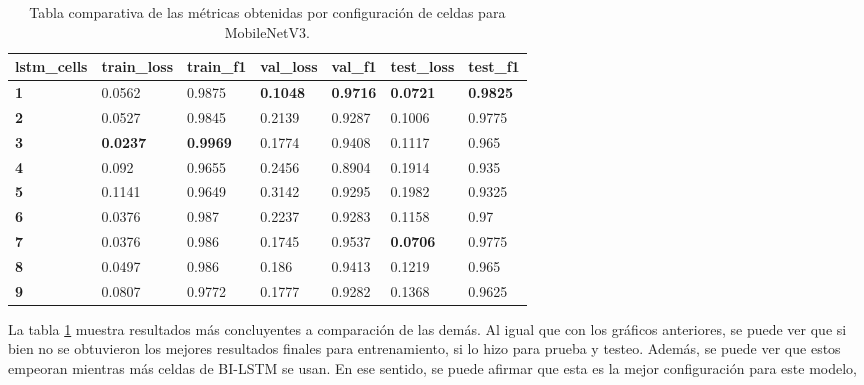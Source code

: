 \begin{table}[h!]
\centering
\begin{tabular}{|l|l|l|l|l|l|l|}
\hline
\textbf{lstm\_cells} & \textbf{train\_loss} & \textbf{train\_f1} & \textbf{val\_loss} & \textbf{val\_f1} & \textbf{test\_loss} & \textbf{test\_f1} \\ \hline
\textbf{1}           & 0.0562               & 0.9875             & \textbf{0.1048}    & \textbf{0.9716}  & \textbf{0.0721}     & \textbf{0.9825}   \\ \hline
\textbf{2}           & 0.0527               & 0.9845             & 0.2139             & 0.9287           & 0.1006              & 0.9775            \\ \hline
\textbf{3}           & \textbf{0.0237}      & \textbf{0.9969}    & 0.1774             & 0.9408           & 0.1117              & 0.965             \\ \hline
\textbf{4}           & 0.092                & 0.9655             & 0.2456             & 0.8904           & 0.1914              & 0.935             \\ \hline
\textbf{5}           & 0.1141               & 0.9649             & 0.3142             & 0.9295           & 0.1982              & 0.9325            \\ \hline
\textbf{6}           & 0.0376               & 0.987              & 0.2237             & 0.9283           & 0.1158              & 0.97              \\ \hline
\textbf{7}           & 0.0376               & 0.986              & 0.1745             & 0.9537           & \textbf{0.0706}     & 0.9775            \\ \hline
\textbf{8}           & 0.0497               & 0.986              & 0.186              & 0.9413           & 0.1219              & 0.965             \\ \hline
\textbf{9}           & 0.0807               & 0.9772             & 0.1777             & 0.9282           & 0.1368              & 0.9625            \\ \hline
\end{tabular}
\caption{ Tabla comparativa de las métricas obtenidas por configuración de celdas para MobileNetV3.}
\label{table:MobileNetV3Metrics}
\end{table}

La tabla \ref{table:MobileNetV3Metrics} muestra resultados más 
concluyentes a comparación de las demás. Al igual que con los gráficos 
anteriores, se puede ver que si bien no se obtuvieron los mejores 
resultados finales para entrenamiento, si lo hizo para prueba y testeo. 
Además, se puede ver que estos empeoran mientras más celdas de BI-LSTM 
se usan. En ese sentido, se puede afirmar que esta es la mejor 
configuración para este modelo, 


